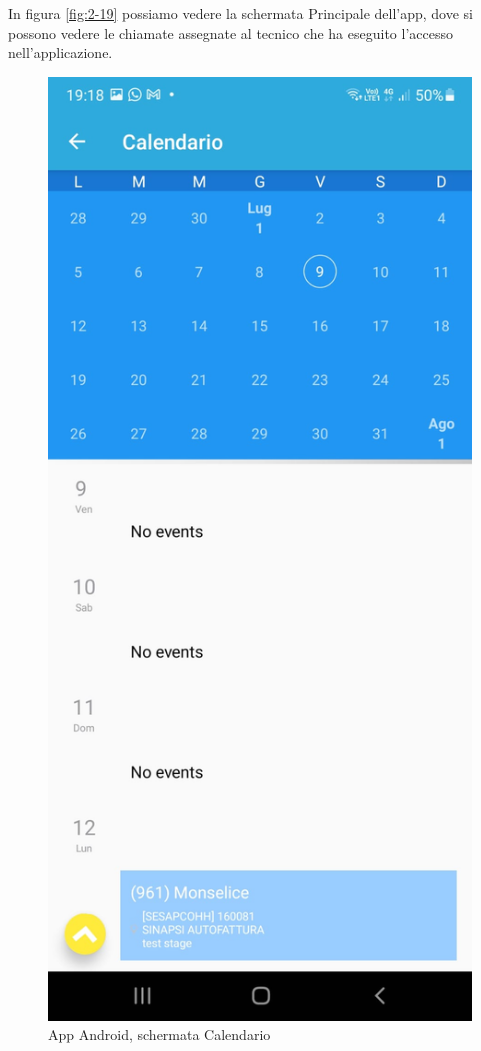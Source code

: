 In figura \ref{fig:2-19} possiamo vedere la schermata Principale dell'app, dove si possono vedere le chiamate assegnate al tecnico che ha eseguito l'accesso nell'applicazione.
\begin{figure}[!h] 
	\centering 
	\includegraphics[scale = 0.11]{immagini/app Android/calendario-android.jpeg}
	\caption {App Android, schermata Calendario}
	\label{fig:2-20}
\end{figure}
